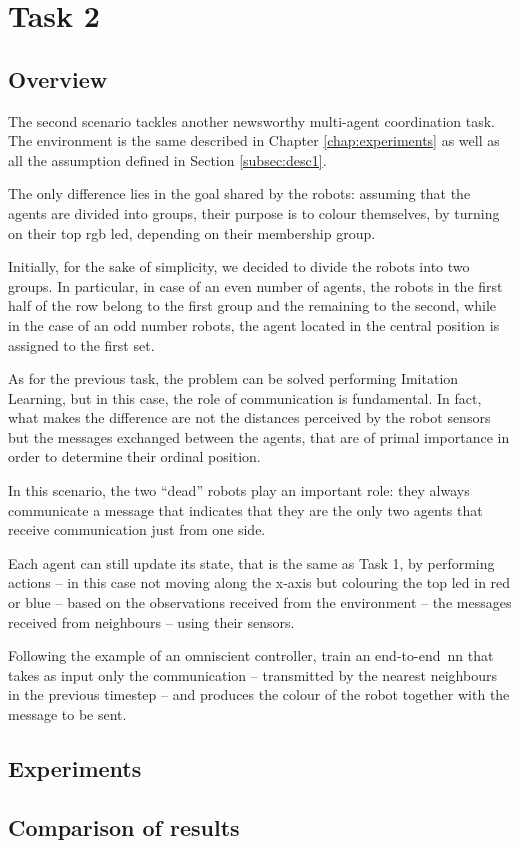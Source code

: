 \section{Task 2}
\label{sec:task2}

\subsection{Overview}
\label{subsec:desc2}

The second scenario tackles another newsworthy multi-agent coordination task. 
The environment is the same described in Chapter \ref{chap:experiments} as 
well as all the assumption defined in Section \ref{subsec:desc1}.

The only difference lies in the goal shared by the robots: assuming that the agents 
are divided into groups, their purpose is to colour themselves, by turning on their 
top \gls{rgb} \gls{led}, depending on their membership group.

Initially, for the sake of simplicity, we decided to divide the robots into two 
groups. In particular, in case of an even number of agents, the robots in the first 
half of the row belong to the first group and the remaining to the second, while in 
the case of an odd number robots, the agent located in the central position is 
assigned to the first set.

As for the previous task, the problem can be solved performing Imitation 
Learning, but in this case, the role of communication is fundamental. In fact, what 
makes the difference are not the distances perceived by the robot sensors but the 
messages exchanged between the agents, that are of primal importance in order 
to determine their ordinal position. 

In this scenario, the two ``dead'' robots play an important role: they always 
communicate a message that indicates that they are the only two agents that 
receive communication just from one side.

Each agent can still update its state, that is the same as Task 1, by performing 
actions – in this case not moving along the x-axis but colouring the top \gls{led} 
in red or blue – based on the observations received from the environment – the 
messages received from neighbours – using their sensors. 

Following the example of an omniscient controller, train an end-to-end \gls{nn} 
that takes as input only the communication – transmitted by the nearest 
neighbours in the previous timestep – and produces the colour of the robot 
together with the message to be sent.

\subsection{Experiments}
\label{subsec:ex2}

\subsection{Comparison of results}
\label{subsec:results2}
